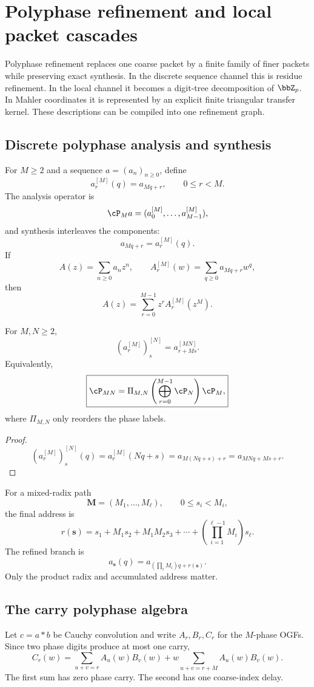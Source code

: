 \section{Polyphase refinement and local packet cascades}

Polyphase refinement replaces one coarse packet by a finite family of finer packets while preserving exact synthesis. In the discrete sequence channel this is residue refinement. In the local channel it becomes a digit-tree decomposition of $\bbZ_p$. In Mahler coordinates it is represented by an explicit finite triangular transfer kernel. These descriptions can be compiled into one refinement graph.

\subsection{Discrete polyphase analysis and synthesis}
For $M\geq2$ and a sequence $a=(a_n)_{n\geq0}$, define
\[
 \boxed{a_r^{[M]}(q)=a_{Mq+r},\qquad0\leq r<M.}
\]
The analysis operator is
\[
 \cP_Ma=(a_0^{[M]},\ldots,a_{M-1}^{[M]}),
\]
and synthesis interleaves the components:
\[
 \boxed{a_{Mq+r}=a_r^{[M]}(q).}
\]
If
\[
 A(z)=\sum_{n\geq0}a_nz^n,
 \qquad A_r^{[M]}(w)=\sum_{q\geq0}a_{Mq+r}w^q,
\]
then
\[
 \boxed{A(z)=\sum_{r=0}^{M-1}z^rA_r^{[M]}(z^M).}
\]

\begin{theorem}
For $M,N\geq2$,
\[
 \boxed{\left(a_r^{[M]}\right)_s^{[N]}=a_{r+Ms}^{[MN]}.}
\]
Equivalently,
\[
 \boxed{\cP_{MN}=\Pi_{M,N}\left(\bigoplus_{r=0}^{M-1}\cP_N\right)\cP_M,}
\]
where $\Pi_{M,N}$ only reorders the phase labels.
\end{theorem}

\begin{proof}
\[
 \left(a_r^{[M]}\right)_s^{[N]}(q)
 =a_r^{[M]}(Nq+s)=a_{M(Nq+s)+r}=a_{MNq+Ms+r}.
\]
\end{proof}

For a mixed-radix path
\[
 \mathbf M=(M_1,\ldots,M_\ell),\qquad0\leq s_i<M_i,
\]
the final address is
\[
 \boxed{r(\mathbf s)=s_1+M_1s_2+M_1M_2s_3+\cdots+\left(\prod_{i=1}^{\ell-1}M_i\right)s_\ell.}
\]
The refined branch is
\[
 a_{\mathbf s}(q)=a_{(\prod_iM_i)q+r(\mathbf s)}.
\]
Only the product radix and accumulated address matter.

\subsection{The carry polyphase algebra}
Let $c=a*b$ be Cauchy convolution and write $A_r,B_r,C_r$ for the $M$-phase OGFs. Since two phase digits produce at most one carry,
\[
 \boxed{C_r(w)=\sum_{u+v=r}A_u(w)B_v(w)+w\sum_{u+v=r+M}A_u(w)B_v(w).}
\]
The first sum has zero phase carry. The second has one coarse-index delay.

